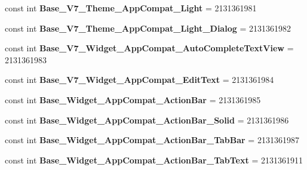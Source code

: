 \begin{DoxyCompactItemize}
const int {\bfseries Base\+\_\+\+V7\+\_\+\+Theme\+\_\+\+App\+Compat\+\_\+\+Light} = 2131361981
\item 
\mbox{\label{class_sample_app_1_1_droid_1_1_resource_1_1_style_a181071b5e8426b291d578bcd7e27de47}} 
const int {\bfseries Base\+\_\+\+V7\+\_\+\+Theme\+\_\+\+App\+Compat\+\_\+\+Light\+\_\+\+Dialog} = 2131361982
\item 
\mbox{\label{class_sample_app_1_1_droid_1_1_resource_1_1_style_a6a5896b1ff3117cbf159f634f7386c22}} 
const int {\bfseries Base\+\_\+\+V7\+\_\+\+Widget\+\_\+\+App\+Compat\+\_\+\+Auto\+Complete\+Text\+View} = 2131361983
\item 
\mbox{\label{class_sample_app_1_1_droid_1_1_resource_1_1_style_a06a128280caacf87c89a3111e8eb1e14}} 
const int {\bfseries Base\+\_\+\+V7\+\_\+\+Widget\+\_\+\+App\+Compat\+\_\+\+Edit\+Text} = 2131361984
\item 
\mbox{\label{class_sample_app_1_1_droid_1_1_resource_1_1_style_a4e839a197b17fc0c9719b226b6bfc55e}} 
const int {\bfseries Base\+\_\+\+Widget\+\_\+\+App\+Compat\+\_\+\+Action\+Bar} = 2131361985
\item 
\mbox{\label{class_sample_app_1_1_droid_1_1_resource_1_1_style_aeb4451beaad5e91dd71ed4bcf207002c}} 
const int {\bfseries Base\+\_\+\+Widget\+\_\+\+App\+Compat\+\_\+\+Action\+Bar\+\_\+\+Solid} = 2131361986
\item 
\mbox{\label{class_sample_app_1_1_droid_1_1_resource_1_1_style_aa67add75d6d39e13a4dc2d5413743274}} 
const int {\bfseries Base\+\_\+\+Widget\+\_\+\+App\+Compat\+\_\+\+Action\+Bar\+\_\+\+Tab\+Bar} = 2131361987
\item 
\mbox{\label{class_sample_app_1_1_droid_1_1_resource_1_1_style_a7e4a5d8d0e0b208cf2722fdb63a6b9c9}} 
const int {\bfseries Base\+\_\+\+Widget\+\_\+\+App\+Compat\+\_\+\+Action\+Bar\+\_\+\+Tab\+Text} = 2131361911
\item 
\mbox{\label{class_sample_app_1_1_droid_1_1_resource_1_1_style_a0f9191dd2ccc1862962a44702c8265aa}} 

\end{DoxyCompactItemize}
